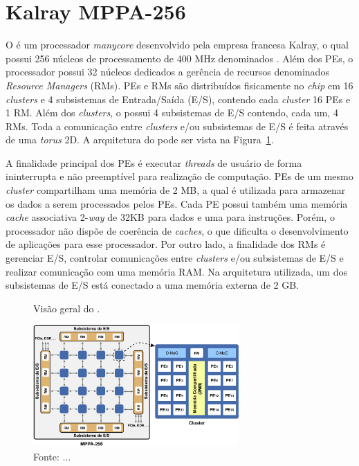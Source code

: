 \section{Kalray MPPA-256}
O \mppa é um processador \textit{manycore} desenvolvido pela empresa francesa
Kalray, o qual possui 256 núcleos de processamento de 400 MHz denominados \pes.
Além dos PEs, o processador possui 32 núcleos dedicados a gerência de recursos
denominados \textit{Resource Managers} (RMs). PEs e RMs são distribuídos
fisicamente no \textit{chip} em 16 \textit{clusters} e 4 subsistemas de
Entrada/Saída (E/S), contendo cada \textit{cluster} 16 PEs e 1 RM. Além dos
\textit{clusters}, o \mppa possui 4 subsistemas de E/S contendo, cada um, 4 RMs.
Toda a comunicação entre \textit{clusters} e/ou subsistemas de E/S é feita
através de uma \noc \textit{torus} 2D. A arquitetura do \mppa pode ser vista na
Figura~\ref{fig:mppa}.

A finalidade principal dos PEs é executar \textit{threads} de usuário de forma
ininterrupta e não preemptível para realização de computação. PEs de um mesmo
\textit{cluster} compartilham uma memória de 2 MB, a qual é utilizada para
armazenar os dados a serem processados pelos PEs. Cada PE possui também uma
memória \textit{cache} associativa 2-\textit{way} de 32KB para dados e uma para
instruções. Porém, o processador não dispõe de coerência de \textit{caches}, o
que dificulta o desenvolvimento de aplicações para esse processador. Por outro
lado, a finalidade dos RMs é gerenciar E/S, controlar comunicações entre
\textit{clusters} e/ou subsistemas de E/S e realizar comunicação com uma memória
RAM. Na arquitetura utilizada, um dos subsistemas de E/S está conectado a uma
memória externa \lpddr de 2 GB.

\begin{figure}[b]
	\centering
	\caption{Visão geral do \mppa.}
	\includegraphics[width=0.7\textwidth]{figs/mppa-overall.pdf}
    \caption*{Fonte: ...}
	\label{fig:mppa}
\end{figure}


